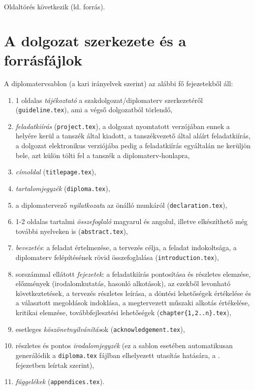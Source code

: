 Oldaltörés következik (ld. forrás).
\newpage

\section{A dolgozat szerkezete és a forrásfájlok}
A diplomatervsablon (a kari irányelvek szerint) az alábbi fő fejezetekből áll:
\begin{enumerate}
	\item 1 oldalas \emph{tájékoztató} a szakdolgozat/diplomaterv szerkezetéről (\verb+guideline.tex+), ami a végső dolgozatból törlendő,
	\item \emph{feladatkiírás} (\verb+project.tex+), a dolgozat nyomtatott verzójában ennek a helyére kerül a tanszék által kiadott, a tanszékvezető által aláírt feladatkiírás, a dolgozat elektronikus verziójába pedig a feladatkiírás egyáltalán ne kerüljön bele, azt külön tölti fel a tanszék a diplomaterv-honlapra,
	\item \emph{címoldal} (\verb+titlepage.tex+),
	\item \emph{tartalomjegyzék} (\verb+diploma.tex+),
	\item a diplomatervező \emph{nyilatkozat}a az önálló munkáról (\verb+declaration.tex+),
	\item 1-2 oldalas tartalmi \emph{összefoglaló} magyarul és angolul, illetve elkészíthető még további nyelveken is (\verb+abstract.tex+),
	\item \emph{bevezetés}: a feladat értelmezése, a tervezés célja, a feladat indokoltsága, a diplomaterv felépítésének rövid összefoglalása (\verb+introduction.tex+),
	\item sorszámmal ellátott \emph{fejezetek}: a feladatkiírás pontosítása és részletes elemzése, előzmények (irodalomkutatás, hasonló alkotások), az ezekből levonható következtetések, a tervezés részletes leírása, a döntési lehetőségek értékelése és a választott megoldások indoklása, a megtervezett műszaki alkotás értékelése, kritikai elemzése, továbbfejlesztési lehetőségek (\verb+chapter{1,2..n}.tex+),
	\item esetleges \emph{köszönetnyilvánítás}ok (\verb+acknowledgement.tex+),
	\item részletes és pontos \emph{irodalomjegyzék} (ez a sablon esetében automatikusan generálódik a \verb+diploma.tex+ fájlban elhelyezett \verb++ utasítás hatására, a . fejezetben leírtak szerint),
	\item \emph{függelékek} (\verb+appendices.tex+).
\end{enumerate}

